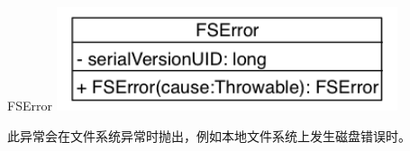 \begin{XeClass}{FSError}
\includegraphics[width=10cm]{cdig/FSError.png}
     
 此异常会在文件系统异常时抛出，例如本地文件系统上发生磁盘错误时。

\end{XeClass}
